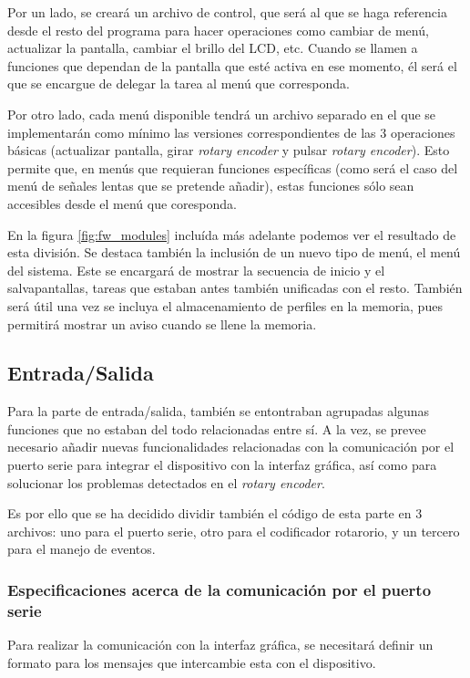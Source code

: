 Por un lado, se creará un archivo de control, que será al que se haga referencia desde el resto del programa para hacer operaciones como cambiar de menú, actualizar la pantalla, cambiar el brillo del LCD, etc. Cuando se llamen a funciones que dependan de la pantalla que esté activa en ese momento, él será el que se encargue de delegar la tarea al menú que corresponda.

Por otro lado, cada menú disponible tendrá un archivo separado en el que se implementarán como mínimo las versiones correspondientes de las 3 operaciones básicas (actualizar pantalla, girar \textit{rotary encoder} y pulsar \textit{rotary encoder}). Esto permite que, en menús que requieran funciones específicas (como será el caso del menú de señales lentas que se pretende añadir), estas funciones sólo sean accesibles desde el menú que coresponda.

En la figura \ref{fig:fw_modules} incluída más adelante podemos ver el resultado de esta división. Se destaca también la inclusión de un nuevo tipo de menú, el menú del sistema. Este se encargará de mostrar la secuencia de inicio y el salvapantallas, tareas que estaban antes también unificadas con el resto. También será útil una vez se incluya el almacenamiento de perfiles en la memoria, pues permitirá mostrar un aviso cuando se llene la memoria.

\subsection{Entrada/Salida}

Para la parte de entrada/salida, también se entontraban agrupadas algunas funciones que no estaban del todo relacionadas entre sí. A la vez, se prevee necesario añadir nuevas funcionalidades relacionadas con la comunicación por el puerto serie para integrar el dispositivo con la interfaz gráfica, así como para solucionar los problemas detectados en el \textit{rotary encoder}.

Es por ello que se ha decidido dividir también el código de esta parte en 3 archivos: uno para el puerto serie, otro para el codificador rotarorio, y un tercero para el manejo de eventos.

\subsubsection{Especificaciones acerca de la comunicación por el puerto serie}

Para realizar la comunicación con la interfaz gráfica, se necesitará definir un formato para los mensajes que intercambie esta con el dispositivo.

